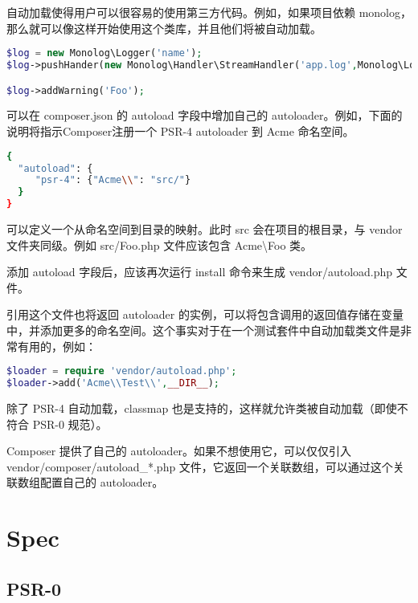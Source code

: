 自动加载使得用户可以很容易的使用第三方代码。例如，如果项目依赖 monolog，那么就可以像这样开始使用这个类库，并且他们将被自动加载。

\begin{lstlisting}[language=PHP]
$log = new Monolog\Logger('name');
$log->pushHander(new Monolog\Handler\StreamHandler('app.log',Monolog\Logger::WARNING));

$log->addWarning('Foo');
\end{lstlisting}

可以在 composer.json 的 autoload 字段中增加自己的 autoloader。例如，下面的说明将指示Composer注册一个 PSR-4 autoloader 到 Acme 命名空间。

\begin{lstlisting}[language=bash]
{
  "autoload": {
     "psr-4": {"Acme\\": "src/"}
  }
}
\end{lstlisting}


可以定义一个从命名空间到目录的映射。此时 src 会在项目的根目录，与 vendor 文件夹同级。例如 src/Foo.php 文件应该包含 Acme\textbackslash Foo 类。


添加 autoload 字段后，应该再次运行 install 命令来生成 vendor/autoload.php 文件。

引用这个文件也将返回 autoloader 的实例，可以将包含调用的返回值存储在变量中，并添加更多的命名空间。这个事实对于在一个测试套件中自动加载类文件是非常有用的，例如：

\begin{lstlisting}[language=PHP]
$loader = require 'vendor/autoload.php';
$loader->add('Acme\\Test\\',__DIR__);
\end{lstlisting}


除了 PSR-4 自动加载，classmap 也是支持的，这样就允许类被自动加载（即使不符合 PSR-0 规范）。

Composer 提供了自己的 autoloader。如果不想使用它，可以仅仅引入 vendor/composer/autoload\_*.php 文件，它返回一个关联数组，可以通过这个关联数组配置自己的 autoloader。

\section{Spec}


\subsection{PSR-0}




